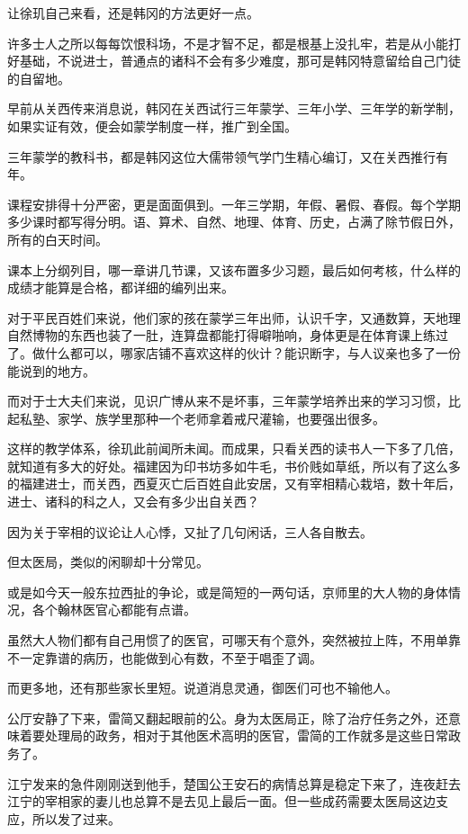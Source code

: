 让徐玑自己来看，还是韩冈的方法更好一点。

许多士人之所以每每饮恨科场，不是才智不足，都是根基上没扎牢，若是从小能打好基础，不说进士，普通点的诸科不会有多少难度，那可是韩冈特意留给自己门徒的自留地。

早前从关西传来消息说，韩冈在关西试行三年蒙学、三年小学、三年学的新学制，如果实证有效，便会如蒙学制度一样，推广到全国。

三年蒙学的教科书，都是韩冈这位大儒带领气学门生精心编订，又在关西推行有年。

课程安排得十分严密，更是面面俱到。一年三学期，年假、暑假、春假。每个学期多少课时都写得分明。语、算术、自然、地理、体育、历史，占满了除节假日外，所有的白天时间。

课本上分纲列目，哪一章讲几节课，又该布置多少习题，最后如何考核，什么样的成绩才能算是合格，都详细的编列出来。

对于平民百姓们来说，他们家的孩在蒙学三年出师，认识千字，又通数算，天地理自然博物的东西也装了一肚，连算盘都能打得噼啪响，身体更是在体育课上练过了。做什么都可以，哪家店铺不喜欢这样的伙计？能识断字，与人议亲也多了一份能说到的地方。

而对于士大夫们来说，见识广博从来不是坏事，三年蒙学培养出来的学习习惯，比起私塾、家学、族学里那种一个老师拿着戒尺灌输，也要强出很多。

这样的教学体系，徐玑此前闻所未闻。而成果，只看关西的读书人一下多了几倍，就知道有多大的好处。福建因为印书坊多如牛毛，书价贱如草纸，所以有了这么多的福建进士，而关西，西夏灭亡后百姓自此安居，又有宰相精心栽培，数十年后，进士、诸科的科之人，又会有多少出自关西？

因为关于宰相的议论让人心悸，又扯了几句闲话，三人各自散去。

但太医局，类似的闲聊却十分常见。

或是如今天一般东拉西扯的争论，或是简短的一两句话，京师里的大人物的身体情况，各个翰林医官心都能有点谱。

虽然大人物们都有自己用惯了的医官，可哪天有个意外，突然被拉上阵，不用单靠不一定靠谱的病历，也能做到心有数，不至于唱歪了调。

而更多地，还有那些家长里短。说道消息灵通，御医们可也不输他人。

公厅安静了下来，雷简又翻起眼前的公。身为太医局正，除了治疗任务之外，还意味着要处理局的政务，相对于其他医术高明的医官，雷简的工作就多是这些日常政务了。

江宁发来的急件刚刚送到他手，楚国公王安石的病情总算是稳定下来了，连夜赶去江宁的宰相家的妻儿也总算不是去见上最后一面。但一些成药需要太医局这边支应，所以发了过来。

